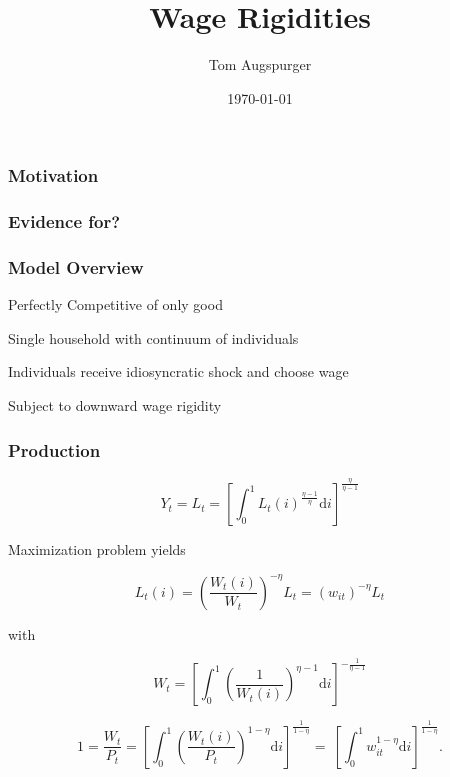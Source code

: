 \documentclass{beamer}
\title{Wage Rigidities}
\author{Tom Augspurger}
\date{\today}
\begin{document}
\frame{\titlepage}


\begin{frame}[t]\frametitle{Motivation}



\end{frame}

\begin{frame}[t]\frametitle{Evidence for?}



\end{frame}

\begin{frame}[t]\frametitle{Model Overview}

Perfectly Competitive of only good

Single household with continuum of individuals

Individuals receive idiosyncratic shock and choose wage

Subject to downward wage rigidity

\end{frame}

\begin{frame}[t]\frametitle{Production}

\begin{equation*} \label{eq:agg_labor}
    Y_t = L_t = \left[ \int_0^1 L_t(i)^{\frac{\eta - 1}{\eta}} \mathrm{d}i \right]^{\frac{\eta}{\eta - 1}}
\end{equation*}

Maximization problem yields

\begin{equation*}
    \label{eq:labor_demand}
    L_t(i) = \left( \frac{W_t(i)}{W_t} \right)^{-\eta}L_t = (w_{it})^{-\eta}L_t
\end{equation*}

with

\begin{equation*} \label{eq:wage_index}
    W_t = \left[\int_{0}^{1}\left(\frac{1}{W_t(i)}\right)^{\eta - 1} \mathrm{d}i \right]^{-\frac{1}{\eta - 1}}
\end{equation*}

\begin{equation*} \label{eq:real_wage}
    1 = \frac{W_t}{P_t} = \left[\int_{0}^{1} \left( \frac{W_t(i)}{P_t} \right)^{1 - \eta} \mathrm{d}i \right]^{\frac{1}{1 - \eta} }\!\!\!\! = \ \left[\int_{0}^{1} \! w_{it}^{1 - \eta} \mathrm{d}i \right]^{ \frac{1}{1 - \eta} }.
\end{equation*}


\end{frame}
\end{document}
